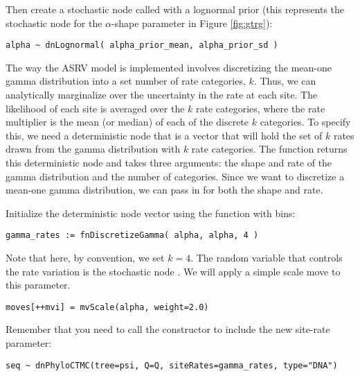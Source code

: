 Then create a stochastic node called  with a lognormal prior (this represents the stochastic node for the $\alpha$-shape parameter in Figure \ref{fig:gtrg}):
{\tt\begin{snugshade*}
\begin{lstlisting}
alpha ~ dnLognormal( alpha_prior_mean, alpha_prior_sd )
\end{lstlisting}
\end{snugshade*}}

The way the ASRV model is implemented involves discretizing the mean-one gamma distribution into a set number of rate categories, $k$. 
Thus, we can analytically marginalize over the uncertainty in the rate at each site. 
The likelihood of each site is averaged over the $k$ rate categories, where the rate multiplier is the mean (or median) of each of the discrete $k$ categories. 
To specify this, we need a deterministic node that is a vector that will hold the set of $k$ rates drawn from the gamma distribution with $k$ rate categories. 
The  function returns this deterministic node and takes three arguments: the shape and rate of the gamma distribution and the number of categories. 
Since we want to discretize a mean-one gamma distribution, we can pass in  for both the shape and rate.

Initialize the  deterministic node vector using the   function with  bins:
{\tt \begin{snugshade*}
\begin{lstlisting}
gamma_rates := fnDiscretizeGamma( alpha, alpha, 4 )
\end{lstlisting}
\end{snugshade*}}

Note that here, by convention, we set $k = 4$.
The random variable that controls the rate variation is the stochastic node . 
We will apply a simple scale move to this parameter.
{\tt \begin{snugshade*}
\begin{lstlisting}
moves[++mvi] = mvScale(alpha, weight=2.0)
\end{lstlisting}
\end{snugshade*}}

Remember that you need to call the  constructor to include the new site-rate parameter:
{\tt \begin{snugshade*}
\begin{lstlisting}
seq ~ dnPhyloCTMC(tree=psi, Q=Q, siteRates=gamma_rates, type="DNA")
\end{lstlisting}
\end{snugshade*}}


